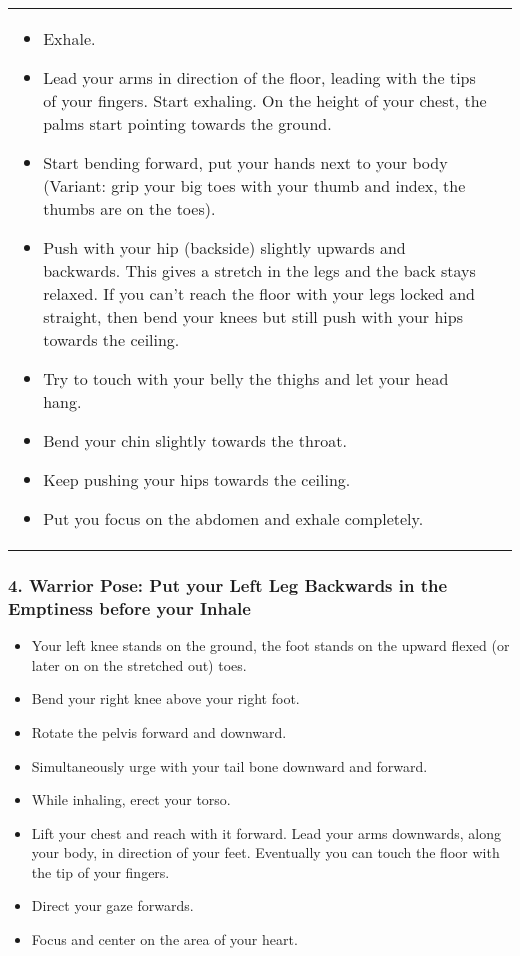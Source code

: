 \documentclass[../Book.Stress_regulation.tex]{subfiles}
\begin{document}
\begin{tabular}{p{9.7cm} p{1.8cm}}

\begin{itemize}
\item Exhale.
\item Lead your arms in direction of the floor, leading with the tips of your fingers. Start exhaling.
  On the height of your chest, the palms start pointing towards the ground. 
\item Start bending forward, put your hands next to your body (Variant: grip your big toes with your thumb  and index, the thumbs are on the toes).
\item Push with your hip (backside) slightly upwards and backwards. This gives a stretch in the legs and the back stays relaxed.
  If you can't reach the floor with your legs locked and straight, then bend your knees but still push with your hips towards the ceiling.
\item Try to touch with your belly the thighs and let your head hang.
\item Bend your chin slightly towards the throat.
\item Keep pushing your hips towards the ceiling.
\item Put you focus on the abdomen and exhale completely.  
\end{itemize}
    &
    \raisebox{-1.2\totalheight}{\texttt{[image: SS\_ForwardBend]}}
  
  \end{tabular}


\subsubsection{4. Warrior Pose: Put your Left Leg Backwards in the Emptiness before your Inhale}
\begin{itemize}
\item Your left knee stands on the ground, the foot stands on the upward flexed (or later on on the stretched out) toes.
\item Bend your right knee above your right foot.
\item Rotate the pelvis forward and downward.
\item Simultaneously urge with your tail bone downward and forward.
\item While inhaling, erect your torso.
\item Lift your chest and reach with it forward. Lead your arms downwards, along your body, in direction of your feet.
  Eventually you can touch the floor with the tip of your fingers.
\item Direct your gaze forwards.
\item Focus and center on the area of your heart.    
\end{itemize}
\end{document}
